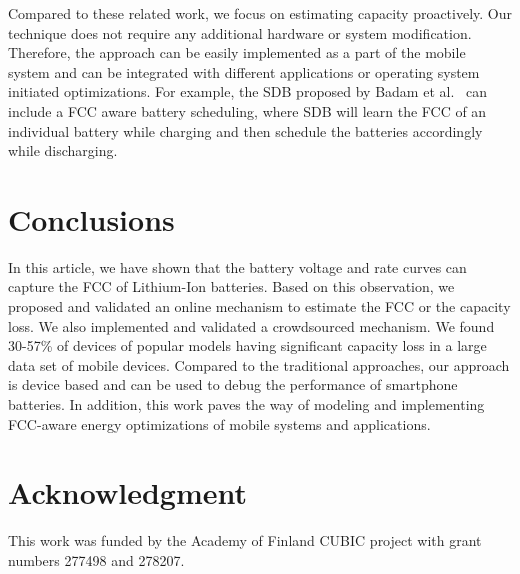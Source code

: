 \documentclass[journal]{IEEEtran}
\begin{document}
Compared to these related work, we focus on estimating capacity proactively. Our technique does not require any additional hardware or system modification. Therefore, the  approach can be easily implemented as a part of the mobile system and can be integrated with different applications or operating system initiated optimizations. For example, the SDB proposed by Badam et al.~\cite{Badam:2015} can include a FCC aware battery scheduling, where SDB will learn the FCC of an individual battery while charging and then schedule the batteries accordingly while discharging.






\section{Conclusions}
\label{sec:nine}

In this article, we have shown that the battery voltage and rate curves can capture the FCC of Lithium-Ion batteries. Based on this observation, we proposed and validated an online mechanism to estimate the FCC or the capacity loss. We also implemented and validated a crowdsourced mechanism. We found 30-57\% of devices of popular models having significant capacity loss in a large data set of mobile devices. Compared to the traditional approaches, our approach is device based and can be used to debug the performance of smartphone batteries. In addition, this work paves the way of modeling and implementing FCC-aware energy optimizations of mobile systems and applications. 




\section*{Acknowledgment}
This work was funded by the Academy of Finland CUBIC project with grant numbers 277498 and 278207. 

















\ifCLASSOPTIONcaptionsoff
  \newpage
\fi
\end{document}
